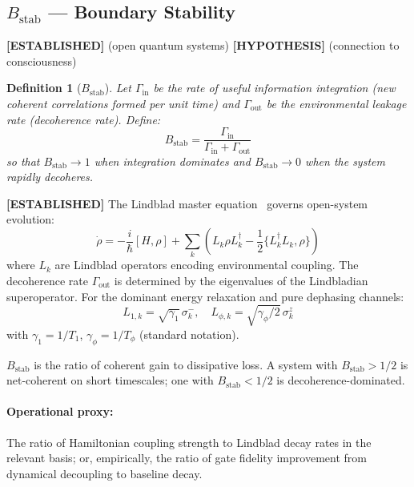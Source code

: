 \documentclass[12pt,letterpaper]{article}
\newtheorem{definition}{Definition}[section]
\newcommand{\ESTABLISHED}[1]{\textcolor{green!50!black}{\textbf{[ESTABLISHED]}} #1}
\newcommand{\HYPOTHESIS}[1]{\textcolor{blue!70!black}{\textbf{[HYPOTHESIS]}} #1}
\newcommand{\Bstab}{B_{\mathrm{stab}}}
\begin{document}
\subsection{\texorpdfstring{$\Bstab$ — Boundary Stability}{Bstab — Boundary Stability}}
\label{sec:Bstab}

\ESTABLISHED{} (open quantum systems) \HYPOTHESIS{} (connection to consciousness)

\begin{definition}[$\Bstab$]
Let $\Gamma_{\mathrm{in}}$ be the rate of useful information integration
(new coherent correlations formed per unit time) and $\Gamma_{\mathrm{out}}$
be the environmental leakage rate (decoherence rate). Define:
\begin{equation}
  \Bstab = \frac{\Gamma_{\mathrm{in}}}{\Gamma_{\mathrm{in}} + \Gamma_{\mathrm{out}}}
  \label{eq:Bstab}
\end{equation}
so that $\Bstab \to 1$ when integration dominates and $\Bstab \to 0$ when
the system rapidly decoheres.
\end{definition}

\ESTABLISHED{} The Lindblad master equation~\cite{Lindblad1976} governs
open-system evolution:
\begin{equation}
  \dot{\rho} = -\frac{i}{\hbar}[H, \rho] + \sum_k
    \left(L_k \rho L_k^\dagger - \frac{1}{2}\{L_k^\dagger L_k, \rho\}\right)
\end{equation}
where $L_k$ are Lindblad operators encoding environmental coupling.
The decoherence rate $\Gamma_{\mathrm{out}}$ is determined by the
eigenvalues of the Lindbladian superoperator. For the dominant energy
relaxation and pure dephasing channels:
\begin{equation}
  L_{1,k} = \sqrt{\gamma_1}\,\sigma^-_k, \quad
  L_{\phi,k} = \sqrt{\gamma_\phi/2}\,\sigma^z_k
\end{equation}
with $\gamma_1 = 1/T_1$, $\gamma_\phi = 1/T_\phi$ (standard notation).

$\Bstab$ is the ratio of coherent gain to dissipative loss. A system with
$\Bstab > 1/2$ is net-coherent on short timescales; one with $\Bstab < 1/2$
is decoherence-dominated.

\paragraph{Operational proxy:} The ratio of Hamiltonian coupling strength
to Lindblad decay rates in the relevant basis; or, empirically, the ratio
of gate fidelity improvement from dynamical decoupling to baseline decay.
\end{document}
